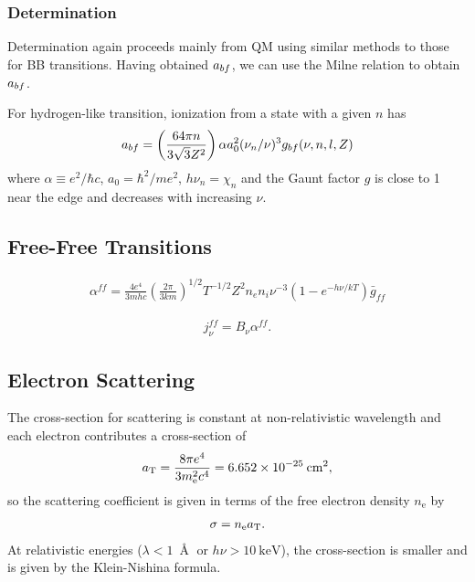 \subsubsection{Determination}

Determination again proceeds mainly from QM using similar
methods to those for BB transitions. Having obtained
$a_{bf}$, we can use the Milne relation to obtain
$a_{bf}$.

For hydrogen-like transition, ionization from a state with a
given $n$ has
\begin{align}
a_{bf} = \left(\frac{64\pi n}{3\sqrt{3} Z^2}\right)
\alpha a_0^2 (\nu_n/\nu)^3 g_{bf}(\nu, n, l, Z)
\end{align}
where $\alpha \equiv e^2/\hbar c$, $a_0 = \hbar^2/me^2$, $h\nu_n = \chi_n$ and the Gaunt factor $g$ is close to 1
near the edge and decreases with increasing $\nu$.

\subsection{Free-Free Transitions}

\begin{align}
\alpha^{ff} = 
\frac{4e^4}{3mhc}\left(\frac{2\pi}{3km}\right)^{1/2}
T^{-1/2} Z^2 n_e n_i \nu^{-3} (1 - e^{-h\nu/kT}) \bar g_{ff}
\end{align}

\begin{align}
j^{ff}_\nu = B_\nu \alpha^{ff}.
\end{align}

\subsection{Electron Scattering}

The cross-section for scattering is constant
at non-relativistic wavelength and each electron contributes
a cross-section of
\begin{align}
a_\mathrm{T} = 
\frac{8 \pi e^4}{3 m_\mathrm{e}^2 c^4} = 6.652 \times
10^{-25}\:\mathrm{cm^2},
\end{align}
so the scattering coefficient is given in terms of the free
electron density $n_\mathrm{e}$ by
\begin{align}
\sigma = n_\mathrm{e} a_\mathrm{T}.
\end{align}
At relativistic energies ($\lambda < 1\:\Angstrom$ or $h\nu
> 10\:\mathrm{keV}$), the cross-section is smaller and is
given by the Klein-Nishina formula. 

